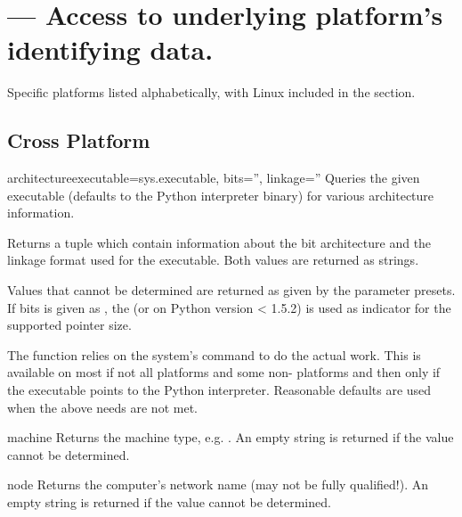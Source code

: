 \section{ --- 
   Access to underlying platform's identifying data.}



\begin{notice}
  Specific platforms listed alphabetically, with Linux included in the
  \UNIX{} section.
\end{notice}

\subsection{Cross Platform}

\begin{funcdesc}{architecture}{executable=sys.executable, bits='', linkage=''}
  Queries the given executable (defaults to the Python interpreter
  binary) for various architecture information.

  Returns a tuple  which contain information about
  the bit architecture and the linkage format used for the
  executable. Both values are returned as strings.

  Values that cannot be determined are returned as given by the
  parameter presets. If bits is given as , the
  (or  on Python version < 1.5.2) is used as
  indicator for the supported pointer size.

  The function relies on the system's  command to do the
  actual work. This is available on most if not all \UNIX{} 
  platforms and some non-\UNIX{} platforms and then only if the
  executable points to the Python interpreter.  Reasonable defaults
  are used when the above needs are not met.
\end{funcdesc}

\begin{funcdesc}{machine}{}
  Returns the machine type, e.g. .
  An empty string is returned if the value cannot be determined.
\end{funcdesc}

\begin{funcdesc}{node}{}
  Returns the computer's network name (may not be fully qualified!).
  An empty string is returned if the value cannot be determined.
\end{funcdesc}

